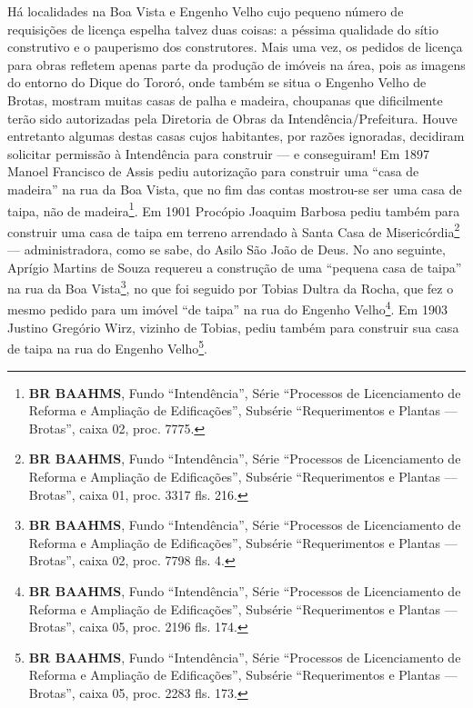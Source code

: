 
Há localidades na Boa Vista e Engenho Velho cujo pequeno número de requisições de licença espelha talvez duas coisas: a péssima qualidade do sítio construtivo e o pauperismo dos construtores. Mais uma vez, os pedidos de licença para obras refletem apenas parte da produção de imóveis na área, pois as imagens do entorno do Dique do Tororó, onde também se situa o Engenho Velho de Brotas, mostram muitas casas de palha e madeira, choupanas que dificilmente terão sido autorizadas pela Diretoria de Obras da Intendência/Prefeitura. Houve entretanto algumas destas casas cujos habitantes, por razões ignoradas, decidiram solicitar permissão à Intendência para construir --- e conseguiram! Em 1897 Manoel Francisco de Assis pediu autorização para construir uma ``casa de madeira'' na rua da Boa Vista, que no fim das contas mostrou-se ser uma casa de taipa, não de madeira\footnote{\textbf{BR BAAHMS}, Fundo ``Intendência'', Série ``Processos de Licenciamento de Reforma e Ampliação de Edificações'', Subsérie ``Requerimentos e Plantas --- Brotas'', caixa 02, proc. 7775.}. Em 1901 Procópio Joaquim Barbosa pediu também para construir uma casa de taipa em terreno arrendado à Santa Casa de Misericórdia\footnote{\textbf{BR BAAHMS}, Fundo ``Intendência'', Série ``Processos de Licenciamento de Reforma e Ampliação de Edificações'', Subsérie ``Requerimentos e Plantas --- Brotas'', caixa 01, proc. 3317 fls. 216.} --- administradora, como se sabe, do Asilo São João de Deus. No ano seguinte, Aprígio Martins de Souza requereu a construção de uma ``pequena casa de taipa'' na rua da Boa Vista\footnote{\textbf{BR BAAHMS}, Fundo ``Intendência'', Série ``Processos de Licenciamento de Reforma e Ampliação de Edificações'', Subsérie ``Requerimentos e Plantas --- Brotas'', caixa 02, proc. 7798 fls. 4.}, no que foi seguido por Tobias Dultra da Rocha, que fez o mesmo pedido para um imóvel ``de taipa'' na rua do Engenho Velho\footnote{\textbf{BR BAAHMS}, Fundo ``Intendência'', Série ``Processos de Licenciamento de Reforma e Ampliação de Edificações'', Subsérie ``Requerimentos e Plantas --- Brotas'', caixa 05, proc. 2196 fls. 174.}. Em 1903 Justino Gregório Wirz, vizinho de Tobias, pediu também para construir sua casa de taipa na rua do Engenho Velho\footnote{\textbf{BR BAAHMS}, Fundo ``Intendência'', Série ``Processos de Licenciamento de Reforma e Ampliação de Edificações'', Subsérie ``Requerimentos e Plantas --- Brotas'', caixa 05, proc. 2283 fls. 173.}. 

